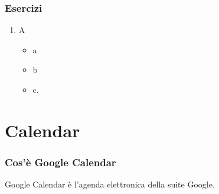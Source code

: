 \documentclass[handout]{beamer}
\begin{document}
\begin{frame}
\frametitle{Esercizi}
\begin{enumerate}
  \item A
  \begin{itemize}
    \item a
    \item b
    \item c.
  \end{itemize}
\end{enumerate}
\end{frame}


\section{Calendar}

\begin{frame}
\frametitle{Cos'è Google Calendar}
Google Calendar è l'\alert{agenda elettronica} della suite Google.\pause

~


\end{frame}
\end{document}
